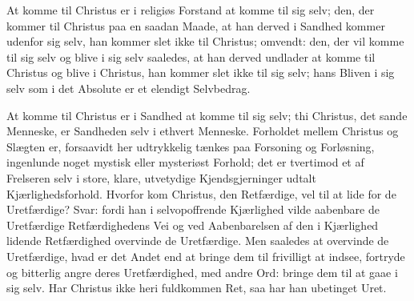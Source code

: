 \documentclass[12pt]{book}
\begin{document}
At komme til Christus er i religiøs Forstand at komme til sig selv;
den, der kommer til Christus paa en saadan Maade, at han derved i
Sandhed kommer udenfor sig selv, han kommer slet ikke til Christus;
omvendt: den, der vil komme til sig selv og blive i sig selv
saaledes, at han derved undlader at komme til Christus og blive i
Christus, han kommer slet ikke til sig selv; hans
Bliven i sig selv som i det Absolute er et elendigt Selvbedrag.

At komme til Christus er i Sandhed at komme til sig selv; thi
Christus, det sande Menneske, er Sandheden selv i ethvert Menneske.
Forholdet mellem Christus og Slægten er, forsaavidt her udtrykkelig
tænkes paa Forsoning og Forløsning, ingenlunde noget mystisk eller
mysteriøst Forhold; det er tvertimod et af Frelseren selv i store,
klare, utvetydige Kjendsgjerninger udtalt Kjærlighedsforhold.
Hvorfor kom Christus, den Retfærdige, vel til at lide for de
Uretfærdige? Svar: fordi han i selvopoffrende Kjærlighed vilde
aabenbare de Uretfærdige Retfærdighedens Vei og ved Aabenbarelsen af
den i Kjærlighed lidende Retfærdighed overvinde de Uretfærdige. Men
saaledes at overvinde de Uretfærdige, hvad er det Andet end at
bringe dem til frivilligt at indsee, fortryde og bitterlig angre
deres Uretfærdighed, med andre Ord: bringe dem til at gaae i sig
selv. Har Christus ikke heri fuldkommen Ret, saa har han ubetinget
Uret.
\end{document}
